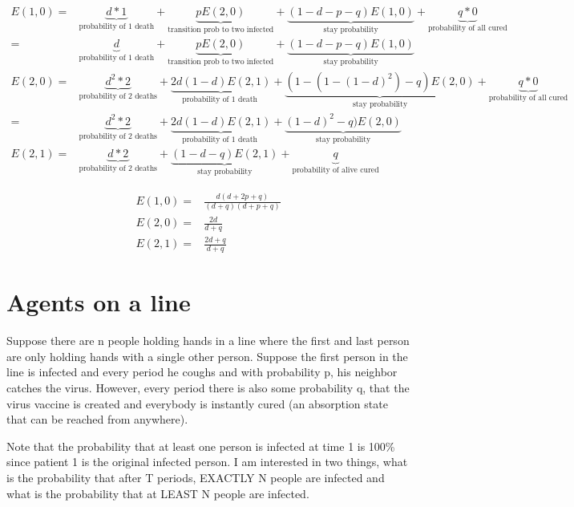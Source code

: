\documentclass[12pt]{report}
\numberwithin{equation}{section}
\begin{document}
\begin{align*}
E(1,0) = &\underbrace{d*1}_\text{probability of 1 death} + 
    \underbrace{pE(2,0) }_\text{transition prob to two infected} +
    \underbrace{(1-d-p-q)E(1,0)}_\text{stay probability} +
    \underbrace{q*0}_\text{probability of all cured} \\
	= &\underbrace{d}_\text{probability of 1 death}+ 
    \underbrace{pE(2,0) }_\text{transition prob to two infected}+ 
    \underbrace{(1-d-p-q)E(1,0)}_\text{stay probability}  \\
E(2,0) = &\underbrace{d^2* 2}_\text{probability of 2 deaths} + 
    \underbrace{2d(1-d)E(2,1) }_\text{probability of 1 death } +
    \underbrace{(1-(1-(1-d)^2)-q)E(2,0) }_\text{stay probability} +
    \underbrace{q*0}_\text{probability of all cured} \\
	   = &\underbrace{d^2* 2}_\text{probability of 2 deaths} + 
    \underbrace{2d(1-d)E(2,1) }_\text{probability of 1 death } +
    \underbrace{(1-d)^2-q)E(2,0) }_\text{stay probability} \\
E(2,1) = &\underbrace{d*2}_\text{probability of 2 deaths} + 
    \underbrace{(1-d-q)E(2,1) }_\text{stay probability} +
    \underbrace{q}_\text{probability of alive cured}
\end{align*}

\begin{align*}
E(1,0) = & \frac{d(d+2p+q)}{(d+q)(d+p+q)} \\
E(2,0) = & \frac{2d}{d+q} \\
E(2,1) = & \frac{2d+q}{d+q} 
\end{align*}

\section{Agents on a line}

Suppose there are n people holding hands in a line where the first and last person are only holding hands with a single other person. Suppose the first person in the line is infected and every period he coughs and with probability p, his neighbor catches the virus. However, every period there is also some probability q, that the virus vaccine is created and everybody is instantly cured (an absorption state that can be reached from anywhere).

Note that the probability that at least one person is infected at time 1 is 100\% since patient 1 is the original infected person. I am interested in two things, what is the probability that after T periods, EXACTLY N people are infected and what is the probability that at LEAST N people are infected.
\end{document}

